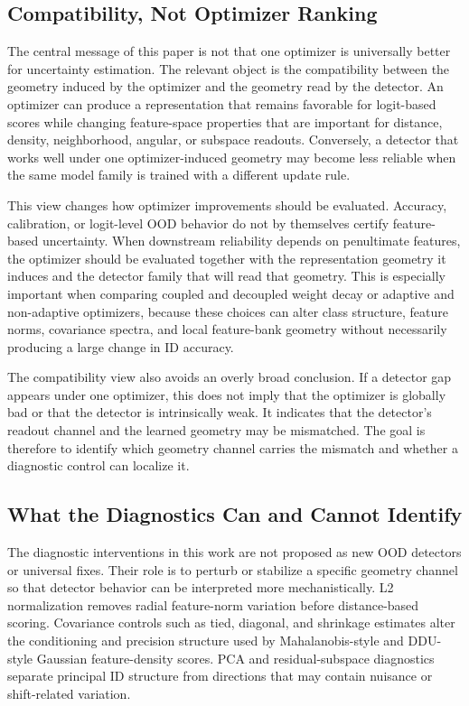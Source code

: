 \subsection{Compatibility, Not Optimizer Ranking}
\label{subsec:compatibility-not-ranking}

The central message of this paper is not that one optimizer is universally better
for uncertainty estimation. The relevant object is the compatibility between the
geometry induced by the optimizer and the geometry read by the detector. An
optimizer can produce a representation that remains favorable for logit-based
scores while changing feature-space properties that are important for distance,
density, neighborhood, angular, or subspace readouts. Conversely, a detector that
works well under one optimizer-induced geometry may become less reliable when the
same model family is trained with a different update rule.

This view changes how optimizer improvements should be evaluated. Accuracy,
calibration, or logit-level OOD behavior do not by themselves certify
feature-based uncertainty. When downstream reliability depends on penultimate
features, the optimizer should be evaluated together with the representation
geometry it induces and the detector family that will read that geometry. This is
especially important when comparing coupled and decoupled weight decay or
adaptive and non-adaptive optimizers, because these choices can alter class
structure, feature norms, covariance spectra, and local feature-bank geometry
without necessarily producing a large change in ID accuracy.

The compatibility view also avoids an overly broad conclusion. If a detector gap
appears under one optimizer, this does not imply that the optimizer is globally
bad or that the detector is intrinsically weak. It indicates that the detector's
readout channel and the learned geometry may be mismatched. The goal is therefore
to identify which geometry channel carries the mismatch and whether a diagnostic
control can localize it.

\subsection{What the Diagnostics Can and Cannot Identify}
\label{subsec:what-diagnostics-identify}

The diagnostic interventions in this work are not proposed as new OOD detectors
or universal fixes. Their role is to perturb or stabilize a specific geometry
channel so that detector behavior can be interpreted more mechanistically. L2
normalization removes radial feature-norm variation before distance-based
scoring. Covariance controls such as tied, diagonal, and shrinkage estimates
alter the conditioning and precision structure used by Mahalanobis-style and
DDU-style Gaussian feature-density scores. PCA and residual-subspace diagnostics
separate principal ID structure from directions that may contain nuisance or
shift-related variation.

